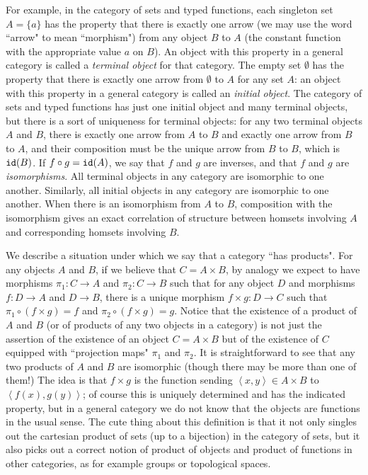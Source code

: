 \documentclass[12pt]{book}
\begin{document}
For example, in the category of sets and typed functions, each singleton set $A=\{a\}$ has the property that there is exactly one arrow (we may use the word ``arrow" to mean ``morphism")  from any object $B$ to $A$ (the constant function with the appropriate value $a$ on $B$).  An object with this property in a general category is called a {\em terminal object\/} for that category.  The empty set $\emptyset$ has the property that there is exactly  one arrow from $\emptyset$ to $A$ for any set $A$:  an object with this property in a general category is called an {\em initial object\/}.  The category of sets and typed functions has just one initial object and many terminal objects, but there is a sort of uniqueness for terminal objects:  for any two terminal objects $A$ and $B$, there is exactly one arrow from $A$ to $B$ and exactly one arrow from $B$ to $A$, and their composition must be
the unique arrow from $B$ to $B$, which is ${\tt id}(B)$.  If $f \circ g = {\tt id}(A)$, we say that $f$ and $g$ are inverses, and that $f$ and $g$ are {\em isomorphisms\/}.  All terminal objects in any category are isomorphic to one another.  Similarly, all initial objects in any category are isomorphic to one another.  When there is an isomorphism from $A$ to $B$, composition with the isomorphism gives an exact correlation of structure between
homsets involving $A$ and corresponding homsets involving $B$.

We describe a situation under which we say that a category ``has products".   For any objects $A$ and $B$, if we believe that $C = A \times B$,
by analogy we expect to have morphisms $\pi_1:C \rightarrow A$ and $\pi_2:C \rightarrow B$ such that for any object $D$ and morphisms $f:D \rightarrow A$ and $D \rightarrow B$, there is a unique morphism $f \times g:D \rightarrow C$ such that $\pi_1 \circ (f \times g) = f$
and $\pi_2\circ (f \times g) = g$.   Notice that the existence of a product of $A$ and $B$ (or of products of any two objects in a category) is not just the assertion of the existence of an object $C = A \times B$ but of the existence of $C$ equipped with ``projection maps" $\pi_1$ and $\pi_2$.
It is straightforward to see that any two products of $A$ and $B$ are isomorphic (though there may be more than one of them!)  The idea
is that $f \times g$ is the function sending $\left<x,y\right> \in A \times B$ to $\left<f(x),g(y)\right>$; of course this is uniquely determined and has the indicated property, but in a general category we do not know that the objects are functions in the usual sense.  The cute thing about this definition is that it not only singles out the cartesian product of sets (up to a bijection) in the category of sets, but it also picks out a correct notion of product
of objects and product of functions in other categories, as for example groups or topological spaces.
\end{document}
